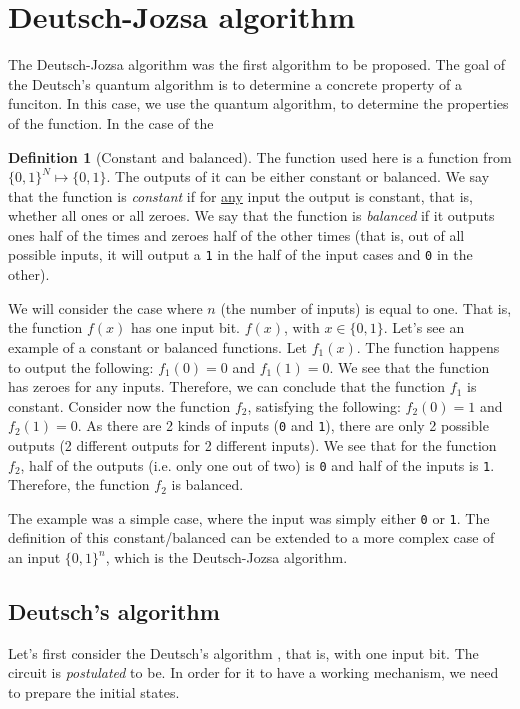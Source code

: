 
\theoremstyle{definition}
\newtheorem{definition}{Definition}[section]

\section{Deutsch-Jozsa algorithm}
The Deutsch-Jozsa algorithm was the first algorithm to be proposed.
The goal of the Deutsch's quantum algorithm is to determine a concrete property of a funciton. In this case, we use the quantum 
algorithm, to determine the properties of the function. In the case of the 
\begin{definition}[Constant and balanced]
  The function used here is a function from $\{0,1\}^N \mapsto \{0,1\}$. The outputs of it can be either constant or balanced.
  We say that the function is \textit{constant} if for \underline{any} input the output is constant, that is, whether all ones or all zeroes.
  We say that the function is \textit{balanced} if it outputs ones half of the times and zeroes half of the other times (that is, out of all 
possible inputs, it will output a \verb|1| in the half of the input cases and \verb|0| in the other).
\end{definition}
We will consider the case where $n$ (the number of inputs) is equal to one. That is, the function $f(x)$ has one input bit. $f(x)$, with $x \in \{0,1\}$.
Let's see an example of a constant or balanced functions. Let $f_1(x)$. The function happens to output the following: $f_1(0)=0$ and $f_1(1)=0$. We see that the 
function has zeroes for any inputs. Therefore, we can conclude that the function $f_1$ is constant. Consider now the function $f_2$, satisfying the following:
$f_2(0)=1$ and $f_2(1)=0$. As there are 2 kinds of inputs (\verb|0| and \verb|1|), there are only 2 possible outputs (2 different outputs for 2 different inputs).
We see that for the function $f_2$, half of the outputs (i.e. only one out of two) is \verb|0| and half of the inputs is \verb|1|. Therefore, the function $f_2$ is 
balanced.

The example was a simple case, where the input was simply either \verb|0| or \verb|1|. The definition of this constant/balanced can be extended to a more complex case 
of an input $\{0,1\}^n$, which is the Deutsch-Jozsa algorithm. 
\subsection*{Deutsch's algorithm}
Let's first consider the Deutsch's algorithm \cite{noauthor_deutschjozsa_2022}, that is, with one input bit. The circuit is \textit{postulated} to be.
In order for it to have a working mechanism, we need to prepare the initial states.


